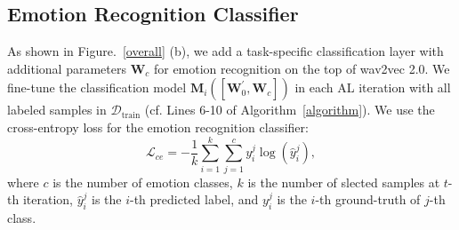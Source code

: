 \documentclass{article}
\begin{document}
\subsection{Emotion Recognition Classifier}

As shown in Figure.~\ref{overall} (b), we add a task-specific classification layer with additional parameters $\mathbf{W}_{c}$ for emotion recognition on the top of wav2vec 2.0. We fine-tune the classification model $\mathbf{M}_{i}([\mathbf{W}_{0}^{'}, \mathbf{W}_{c}])$ in each AL iteration with all labeled samples in $\mathcal{D}_{\textrm{train}}$ (cf. Lines 6-10 of Algorithm~\ref{algorithm}). We use the cross-entropy loss for the emotion recognition classifier:
\begin{equation}
    \mathcal{L}_{ce} = -\frac{1}{k} \sum_{i=1}^{k}\sum_{j=1}^{c} y^{j}_{i} \log{ (\hat{y}_{i}^{j})}, \label{cm3}
\end{equation}
where $c$ is the number of emotion classes,  $k$ is the number of slected samples at $t$-th iteration, $\hat{y}_{i}^{j}$ is the $i$-th predicted label, and $y_{i}^{j}$ is the $i$-th ground-truth of $j$-th class. 
 
\begin{table}[h]
\footnotesize
\caption{Descriptive statistics of the Merged dataset. Ratio of four labels is in the order of Anger : Neutral : Sad : Happy.}
\label{table1}
\centering
{}
\end{table}
\end{document}
